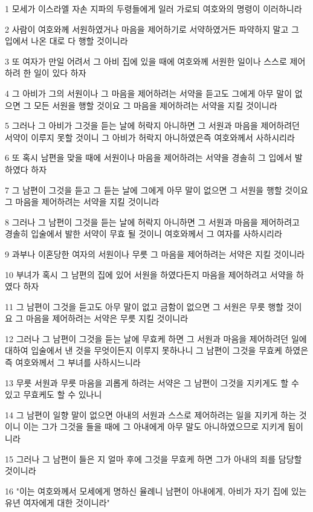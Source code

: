 \par 1 모세가 이스라엘 자손 지파의 두령들에게 일러 가로되 여호와의 명령이 이러하니라
\par 2 사람이 여호와께 서원하였거나 마음을 제어하기로 서약하였거든 파약하지 말고 그 입에서 나온 대로 다 행할 것이니라
\par 3 또 여자가 만일 어려서 그 아비 집에 있을 때에 여호와께 서원한 일이나 스스로 제어하려 한 일이 있다 하자
\par 4 그 아비가 그의 서원이나 그 마음을 제어하려는 서약을 듣고도 그에게 아무 말이 없으면 그 모든 서원을 행할 것이요 그 마음을 제어하려는 서약을 지킬 것이니라
\par 5 그러나 그 아비가 그것을 듣는 날에 허락지 아니하면 그 서원과 마음을 제어하려던 서약이 이루지 못할 것이니 그 아비가 허락지 아니하였은즉 여호와께서 사하시리라
\par 6 또 혹시 남편을 맞을 때에 서원이나 마음을 제어하려는 서약을 경솔히 그 입에서 발하였다 하자
\par 7 그 남편이 그것을 듣고 그 듣는 날에 그에게 아무 말이 없으면 그 서원을 행할 것이요 그 마음을 제어하려는 서약을 지킬 것이니라
\par 8 그러나 그 남편이 그것을 듣는 날에 허락지 아니하면 그 서원과 마음을 제어하려고 경솔히 입술에서 발한 서약이 무효 될 것이니 여호와께서 그 여자를 사하시리라
\par 9 과부나 이혼당한 여자의 서원이나 무릇 그 마음을 제어하려는 서약은 지킬 것이니라
\par 10 부녀가 혹시 그 남편의 집에 있어 서원을 하였다든지 마음을 제어하려고 서약을 하였다 하자
\par 11 그 남편이 그것을 듣고도 아무 말이 없고 금함이 없으면 그 서원은 무릇 행할 것이요 그 마음을 제어하려는 서약은 무릇 지킬 것이니라
\par 12 그러나 그 남편이 그것을 듣는 날에 무효케 하면 그 서원과 마음을 제어하려던 일에 대하여 입술에서 낸 것을 무엇이든지 이루지 못하나니 그 남편이 그것을 무효케 하였은즉 여호와께서 그 부녀를 사하시느니라
\par 13 무릇 서원과 무릇 마음을 괴롭게 하려는 서약은 그 남편이 그것을 지키게도 할 수 있고 무효케도 할 수 있나니
\par 14 그 남편이 일향 말이 없으면 아내의 서원과 스스로 제어하려는 일을 지키게 하는 것이니 이는 그가 그것을 들을 때에 그 아내에게 아무 말도 아니하였으므로 지키게 됨이니라
\par 15 그러나 그 남편이 들은 지 얼마 후에 그것을 무효케 하면 그가 아내의 죄를 담당할 것이니라
\par 16 "이는 여호와께서 모세에게 명하신 율례니 남편이 아내에게, 아비가 자기 집에 있는 유년 여자에게 대한 것이니라"


